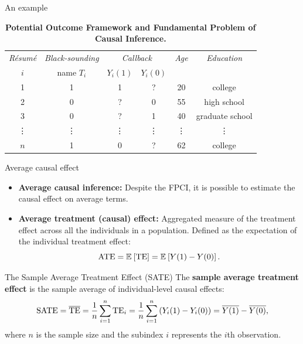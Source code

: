 \documentclass[aspectratio=169]{beamer}
\begin{document}
\begin{frame}{An example}


\begin{table}[h!]
\centering
\caption{\textbf{Potential Outcome Framework and Fundamental Problem of Causal Inference.}}
\label{tab:potential_outcome}
\renewcommand{\arraystretch}{1.3} %
\setlength{\tabcolsep}{10pt}      %
\begin{tabular}{cccccc}
\toprule
\textit{Résumé} & \textit{Black-sounding} & \multicolumn{2}{c}{\textit{Callback}} & \textit{Age} & \textit{Education} \\
$i$ & name $T_i$ & $Y_i(1)$ & $Y_i(0)$ &  &  \\
\midrule
1 & 1 & 1 & ? & 20 & college \\
2 & 0 & ? & 0 & 55 & high school \\
3 & 0 & ? & 1 & 40 & graduate school \\
\vdots & \vdots & \vdots & \vdots & \vdots & \vdots \\
$n$ & 1 & 0 & ? & 62 & college \\
\bottomrule
\end{tabular}
\end{table}

\end{frame}

\begin{frame}{Average causal effect}

\begin{itemize}
    \item \textbf{Average causal inference:} Despite the FPCI, it is possible to estimate the causal effect on average terms.

    \item \textbf{Average treatment (causal) effect:} Aggregated measure of the treatment effect across all the individuals in a population. Defined as the expectation of the individual treatment effect: 
    $$
    \mathrm{ATE} = \Esp[\mathrm{TE}] = \Esp[Y(1) - Y(0)].
    $$
\end{itemize}

\begin{coolblock}{The Sample Average Treatment Effect (SATE)}
    The \textbf{sample average treatment effect} is the sample average of individual-level causal effects:
    $$
    \mathrm{SATE} = \overline{\mathrm{TE}} = \frac{1}{n}\sum_{i=1}^n \mathrm{TE}_i = \frac{1}{n}\sum_{i=1}^n \left( Y_i (1) - Y_i(0)\right) = \overline{Y(1)} - \overline{Y(0)},
    $$
    where $n$ is the sample size and the subindex $i$ represents the $i$th observation.
\end{coolblock}
    
\end{frame}
\end{document}
